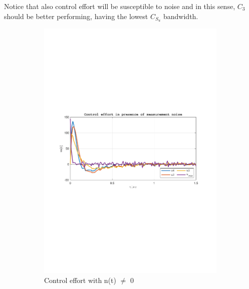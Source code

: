 \documentclass[a4paper, 12pt]{article}
\begin{document}
Notice that also control effort will be susceptible to noise and in this sense, $C_3$ should be better performing, having the lowest $C_{S_u}$ bandwidth.
\begin{figure}[h!]
    \begin{subfigure}[t]{0.60\textwidth}
           \includegraphics[width=\textwidth]{Figures/fig10a.pdf}
           \caption{Control effort with n(t) $\neq$ 0}
           \label{fig:fig10a}
       \end{subfigure}
    \begin{subfigure}[t]{0.4\textwidth}

\end{subfigure}
\end{figure}
\end{document}
